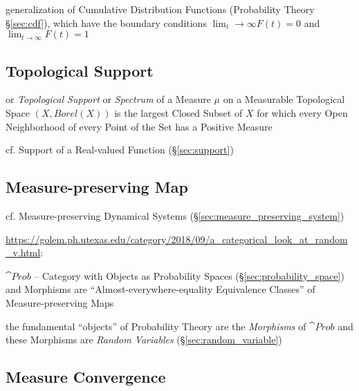 generalization of Cumulative Distribution Functions (Probability Theory
\S\ref{sec:cdf}), which have the boundary conditions
$\lim_t\rightarrow\infty F(t) = 0$ and $\lim_{t\rightarrow\infty}F(t) = 1$



\subsection{Topological Support}\label{sec:topological_support}

or \emph{Topological Support} or \emph{Spectrum} of a Measure $\mu$ on a
Measurable Topological Space $(\xspace{X}, Borel(\xspace{X}))$ is the largest
Closed Subset of $\xspace{X}$ for which every Open Neighborhood of every Point
of the Set has a Positive Measure

cf. Support of a Real-valued Function (\S\ref{sec:support})



\subsection{Measure-preserving Map}\label{sec:measure_preserving_map}

cf. Measure-preserving Dynamical Systems (\S\ref{sec:measure_preserving_system})

\url{https://golem.ph.utexas.edu/category/2018/09/a_categorical_look_at_random_v.html}:

$\cat{Prob}$ -- Category with Objects as Probability Spaces
(\S\ref{sec:probability_space}) and Morphisms are ``Almost-everywhere-equality
Equivalence Classes'' of Measure-preserving Maps

the fundamental ``objects'' of Probability Theory are the \emph{Morphisms} of
$\cat{Prob}$ and these Morphisms are \emph{Random Variables}
(\S\ref{sec:random_variable})



\subsection{Measure Convergence}\label{sec:measure_convergence}

